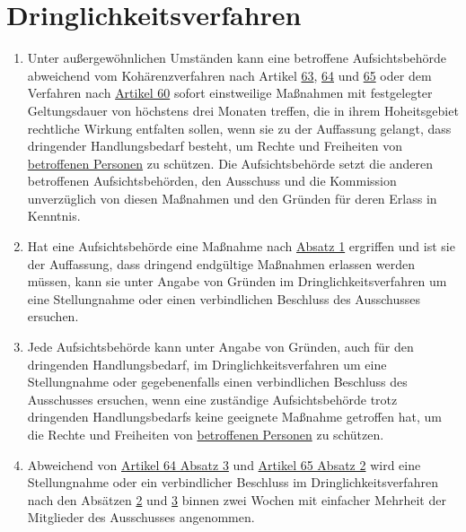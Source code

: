 \chapter{Dringlichkeitsverfahren}
\label{ch:66}


\begin{enumerate}

  \item Unter außergewöhnlichen Umständen kann eine betroffene Aufsichtsbehörde abweichend vom Kohärenzverfahren nach
   Artikel \hyperref[ch:63]{63}, \hyperref[ch:64]{64} und \hyperref[ch:65]{65} oder dem Verfahren nach \hyperref[ch:60]
   {Artikel 60} sofort einstweilige Maßnahmen mit festgelegter Geltungsdauer von höchstens drei Monaten treffen, die in
   ihrem Hoheitsgebiet rechtliche Wirkung entfalten sollen, wenn sie zu der Auffassung gelangt, dass dringender
   Handlungsbedarf besteht, um Rechte und Freiheiten von \hyperref[itm:04-1]{betroffenen Personen} zu schützen. Die Aufsichtsbehörde setzt
   die anderen betroffenen Aufsichtsbehörden, den Ausschuss und die Kommission unverzüglich von diesen Maßnahmen und
   den Gründen für deren Erlass in Kenntnis.
  \label{itm:66-1}

  \item Hat eine Aufsichtsbehörde eine Maßnahme nach \hyperref[itm:66-1]{Absatz 1} ergriffen und ist sie der Auffassung,
   dass dringend endgültige Maßnahmen erlassen werden müssen, kann sie unter Angabe von Gründen im
   Dringlichkeitsverfahren um eine Stellungnahme oder einen verbindlichen Beschluss des Ausschusses ersuchen.
  \label{itm:66-2}

  \item Jede Aufsichtsbehörde kann unter Angabe von Gründen, auch für den dringenden Handlungsbedarf, im
   Dringlichkeitsverfahren um eine Stellungnahme oder gegebenenfalls einen verbindlichen Beschluss des Ausschusses
   ersuchen, wenn eine zuständige Aufsichtsbehörde trotz dringenden Handlungsbedarfs keine geeignete Maßnahme getroffen
   hat, um die Rechte und Freiheiten von \hyperref[itm:04-1]{betroffenen Personen} zu schützen.
  \label{itm:66-3}

  \item Abweichend von \hyperref[itm:64-3]{Artikel 64 Absatz 3} und \hyperref[itm:65-2]{Artikel 65 Absatz 2} wird eine
   Stellungnahme oder ein verbindlicher Beschluss im Dringlichkeitsverfahren nach den Absätzen \hyperref[itm:66-2]
   {2} und \hyperref[itm:66-3]{3} binnen zwei Wochen mit einfacher Mehrheit der Mitglieder des Ausschusses angenommen.
  \label{itm:66-4}

\end{enumerate}


